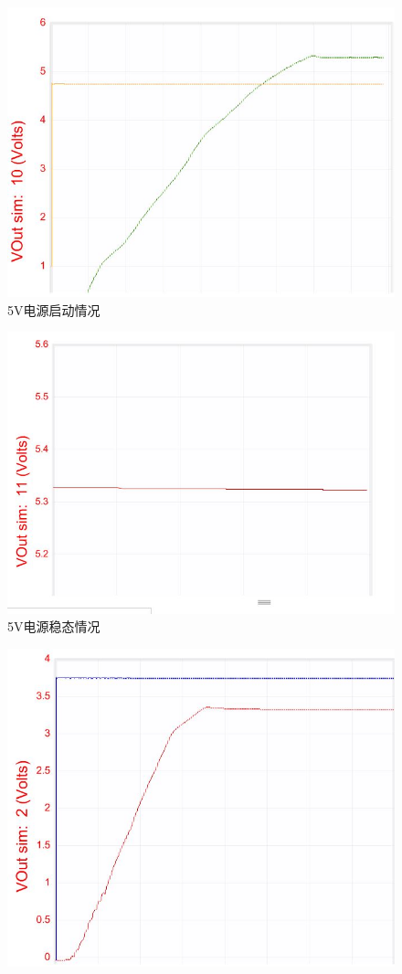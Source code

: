 \documentclass[a4paper]{paper}
\begin{document}
\begin{multicols}{2}
    \begin{figure}[H]
        \centering
        \includegraphics[width = 0.8\columnwidth]{../preview/5sim1.jpg}
        \caption{5V电源启动情况}
    \end{figure}
    \begin{figure}[H]
        \centering
        \includegraphics[width = 0.8\columnwidth]{../preview/5sim2.jpg}
        \caption{5V电源稳态情况}
    \end{figure}
    \begin{figure}[H]
        \centering
        \includegraphics[width = 0.8\columnwidth]{../preview/3sim1.jpg}

\end{figure}
\end{multicols}
\end{document}
